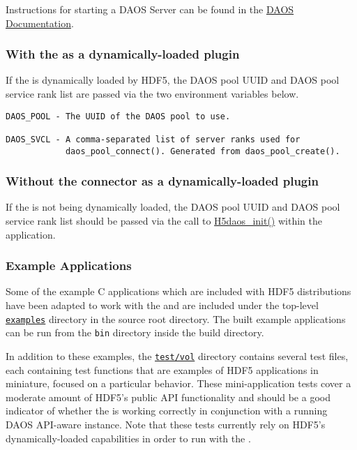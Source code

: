 \documentclass[../users_guide.tex]{subfiles}
\begin{document}
Instructions for starting a DAOS Server can be found in the \href{https://daos-stack.github.io/admin/deployment/#server-startup}{DAOS Documentation}.

\subsubsection{With the \dvc{} as a dynamically-loaded plugin}

If the \dvc{} is dynamically loaded by HDF5, the DAOS pool UUID and
DAOS pool service rank list are passed via the two environment variables below.

\begin{verbatim}
DAOS_POOL - The UUID of the DAOS pool to use.

DAOS_SVCL - A comma-separated list of server ranks used for
            daos_pool_connect(). Generated from daos_pool_create().
\end{verbatim}

\subsubsection{Without the connector as a dynamically-loaded plugin}

If the \dvc{} is not being dynamically loaded, the DAOS pool UUID
and DAOS pool service rank list should be passed via the call to
\hyperref[ref:h5daos_init]{H5daos\_init()} within the application.

\subsubsection{Example Applications}

Some of the example C applications which are included with HDF5 distributions have been adapted to work with the \dvc{} and are included under the top-level \href{https://bitbucket.hdfgroup.org/projects/HDF5VOL/repos/daos-vol/browse/examples}{\texttt{examples}} directory in the \dvc{} source root directory. The built example applications can be run from the \texttt{bin} directory inside the build directory.

In addition to these examples, the \href{https://bitbucket.hdfgroup.org/projects/HDF5VOL/
repos/daos-vol/browse/test}{\texttt{test/vol}} directory contains several test
files, each containing test functions that are examples of HDF5 applications in
miniature, focused on a particular behavior. These mini-application tests cover a moderate 
amount of HDF5's public API functionality and should be a good indicator of
whether the \dvc{} is working correctly in conjunction with a
running DAOS API-aware instance. Note that these tests currently rely on HDF5's
dynamically-loaded \vc{} capabilities in order to run with the \dvc{}.
\end{document}
